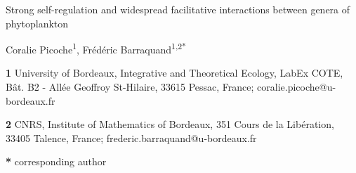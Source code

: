 \documentclass[10pt]{article}
\begin{document}
\thispagestyle{empty}
\vspace*{0.2in}
\doublespacing 

{\Large{}{Strong self-regulation and widespread facilitative interactions
between genera of phytoplankton} %
} \\

\bigskip{}

Coralie Picoche\textsuperscript{1}, Frédéric Barraquand\textsuperscript{1,2{*}}
\\
 \bigskip{}

\textbf{1} University of Bordeaux, Integrative and Theoretical Ecology,
LabEx COTE, Bât. B2 - Allée Geoffroy St-Hilaire, 33615 Pessac, France;
coralie.picoche@u-bordeaux.fr

\textbf{2} CNRS, Institute of Mathematics of Bordeaux, 351 Cours de
la Libération, 33405 Talence, France; frederic.barraquand@u-bordeaux.fr

\textbf{*} corresponding author
  
% 
% 
% 


\newpage
\end{document}
